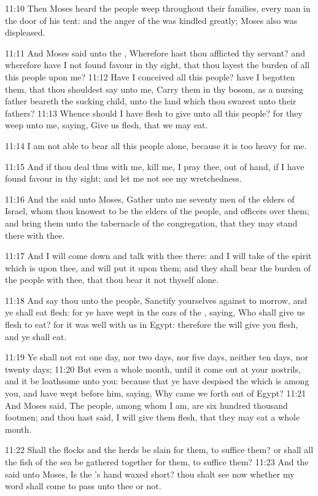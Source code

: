 11:10 Then Moses heard the people weep throughout their families, every man in the door of his tent: and the anger of the \LORD was kindled greatly; Moses also was displeased.

11:11 And Moses said unto the \LORD, Wherefore hast thou afflicted thy servant? and wherefore have I not found favour in thy sight, that thou layest the burden of all this people upon me?  11:12 Have I conceived all this people? have I begotten them, that thou shouldest say unto me, Carry them in thy bosom, as a nursing father beareth the sucking child, unto the land which thou swarest unto their fathers?  11:13 Whence should I have flesh to give unto all this people? for they weep unto me, saying, Give us flesh, that we may eat.

11:14 I am not able to bear all this people alone, because it is too heavy for me.

11:15 And if thou deal thus with me, kill me, I pray thee, out of hand, if I have found favour in thy sight; and let me not see my wretchedness.

11:16 And the \LORD said unto Moses, Gather unto me seventy men of the elders of Israel, whom thou knowest to be the elders of the people, and officers over them; and bring them unto the tabernacle of the congregation, that they may stand there with thee.

11:17 And I will come down and talk with thee there: and I will take of the spirit which is upon thee, and will put it upon them; and they shall bear the burden of the people with thee, that thou bear it not thyself alone.

11:18 And say thou unto the people, Sanctify yourselves against to morrow, and ye shall eat flesh: for ye have wept in the ears of the \LORD, saying, Who shall give us flesh to eat? for it was well with us in Egypt: therefore the \LORD will give you flesh, and ye shall eat.

11:19 Ye shall not eat one day, nor two days, nor five days, neither ten days, nor twenty days; 11:20 But even a whole month, until it come out at your nostrils, and it be loathsome unto you: because that ye have despised the \LORD which is among you, and have wept before him, saying, Why came we forth out of Egypt?  11:21 And Moses said, The people, among whom I am, are six hundred thousand footmen; and thou hast said, I will give them flesh, that they may eat a whole month.

11:22 Shall the flocks and the herds be slain for them, to suffice them?  or shall all the fish of the sea be gathered together for them, to suffice them?  11:23 And the \LORD said unto Moses, Is the \LORD's hand waxed short? thou shalt see now whether my word shall come to pass unto thee or not.

